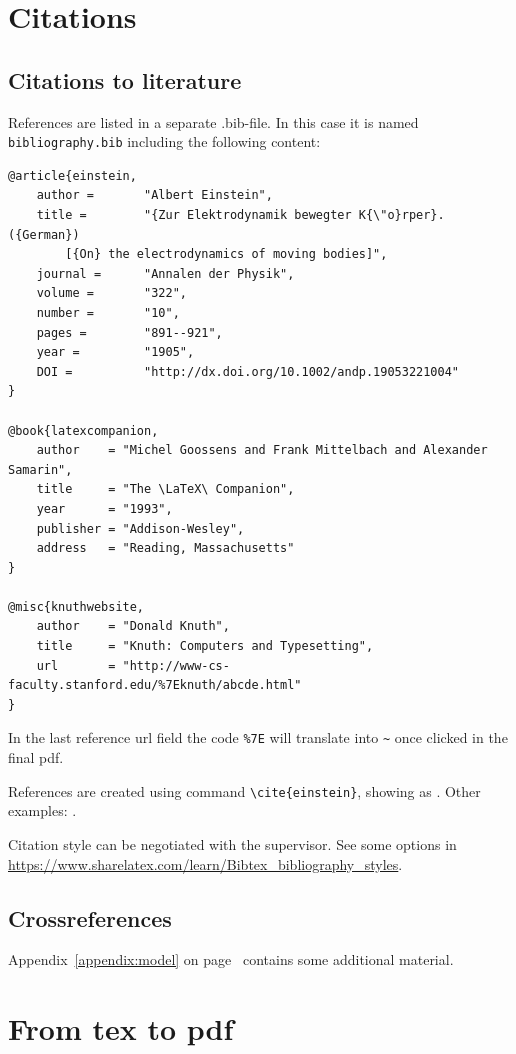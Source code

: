 \chapter{Citations}

\section{Citations to literature}

References are listed in a separate .bib-file. In this case it is named \texttt{bibliography.bib} including the following content:
\begin{verbatim}
@article{einstein,
    author =       "Albert Einstein",
    title =        "{Zur Elektrodynamik bewegter K{\"o}rper}. ({German})
        [{On} the electrodynamics of moving bodies]",
    journal =      "Annalen der Physik",
    volume =       "322",
    number =       "10",
    pages =        "891--921",
    year =         "1905",
    DOI =          "http://dx.doi.org/10.1002/andp.19053221004"
}
 
@book{latexcompanion,
    author    = "Michel Goossens and Frank Mittelbach and Alexander Samarin",
    title     = "The \LaTeX\ Companion",
    year      = "1993",
    publisher = "Addison-Wesley",
    address   = "Reading, Massachusetts"
}
 
@misc{knuthwebsite,
    author    = "Donald Knuth",
    title     = "Knuth: Computers and Typesetting",
    url       = "http://www-cs-faculty.stanford.edu/%7Eknuth/abcde.html"
}
\end{verbatim}

In the last reference url field the code \verb+%7E+ will translate into \verb+~+ once clicked in the final pdf.

References are created using command \texttt{\textbackslash cite\{einstein\}}, showing as \citep{einstein}. Other examples: \citep{latexcompanion,knuthwebsite}.

Citation style can be negotiated with the supervisor. See some options in \url{https://www.sharelatex.com/learn/Bibtex_bibliography_styles}.

\section{Crossreferences}

Appendix~\ref{appendix:model} on page~\pageref{appendix:model} contains some additional material.

\chapter{From tex to pdf}


